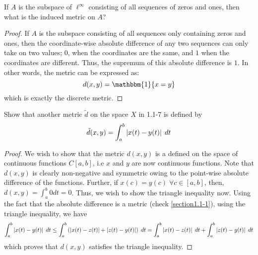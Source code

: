 {\begin{question}
    If $A$ is the subspace of $\ell^\infty$ consisting of all sequences of zeros and ones, then what is the induced metric on $A$?
    \label{section1.1-7}
\end{question}
\begin{proof}
    If $A$ is the subspace consisting of all sequences only containing zeros and ones, then the coordinate-wise absolute difference of any two sequences can only take on two values; $0$, when the coordinates are the same, and $1$ when the coordinates are different. Thus, the supremum of this absolute difference is $1$. In other words, the metric can be expressed as:
    \[d(x,y) = \mathbbm{1}\{x = y\}\]
    which is exactly the discrete metric.
\end{proof}

\begin{question}
    Show that another metric $\tilde{d}$ on the space $X$ in 1.1-7 is defined by 
    \[\tilde{d}(x,y) = \int_{a}^{b} \left\lvert x(t) - y(t) \right\rvert \; dt\]
    \label{section1.1-8}
\end{question}
\begin{proof}
    We wish to show that the metric $d(x,y)$ is a defined on the space of continuous functions $C[a,b]$, i.e $x$ and $y$ are now continuous functions. Note that $d(x,y)$ is clearly non-negative and symmetric owing to the point-wise absolute difference of the functions. Further, if $x(c) = y(c) \; \forall c \in [a,b]$, then, $d(x,y) = \int_{a}^{b} 0 dt = 0$. Thus, we wish to show the triangle inequality now. Using the fact that the absolute difference is a metric (check \ref{section1.1-1}), using the triangle inequality, we have
    \[\int_{a}^{b} \left\lvert x(t) - y(t) \right\rvert \; dt \leq \int_{a}^{b} \left( \left\lvert x(t) - z(t) \right\rvert + \left\lvert z(t) - y(t) \right\rvert \right) \; dt = \int_{a}^{b} \left\lvert x(t) - z(t) \right\rvert \; dt + \int_{a}^{b} \left\lvert z(t) - y(t) \right\rvert \; dt\]
    which proves that $d(x,y)$ satisfies the triangle inequality.
 \end{proof}

}
